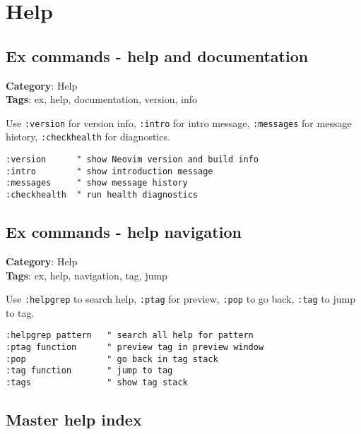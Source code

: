 {{{{{\chapter{Help}
\section{Ex commands - help and documentation}

\textbf{Category}: Help\\ \textbf{Tags}: ex, help, documentation, version, info
\vspace{0.5cm}

Use {\footnotesize \Verb§:version§} for version info, {\footnotesize \Verb§:intro§} for intro message, {\footnotesize \Verb§:messages§} for message history, {\footnotesize \Verb§:checkhealth§} for diagnostics.

\begin{Exa*}{}
\begin{Verbatim}[fontsize=\footnotesize, breaklines, breakanywhere]
:version      " show Neovim version and build info
:intro        " show introduction message
:messages     " show message history
:checkhealth  " run health diagnostics
\end{Verbatim}
\end{Exa*}

\section{Ex commands - help navigation}

\textbf{Category}: Help\\ \textbf{Tags}: ex, help, navigation, tag, jump
\vspace{0.5cm}

Use {\footnotesize \Verb§:helpgrep§} to search help, {\footnotesize \Verb§:ptag§} for preview, {\footnotesize \Verb§:pop§} to go back, {\footnotesize \Verb§:tag§} to jump to tag.

\begin{Exa*}{}
\begin{Verbatim}[fontsize=\footnotesize, breaklines, breakanywhere]
:helpgrep pattern   " search all help for pattern
:ptag function      " preview tag in preview window
:pop                " go back in tag stack
:tag function       " jump to tag
:tags               " show tag stack
\end{Verbatim}
\end{Exa*}

\section{Master help index}

}}}}}
